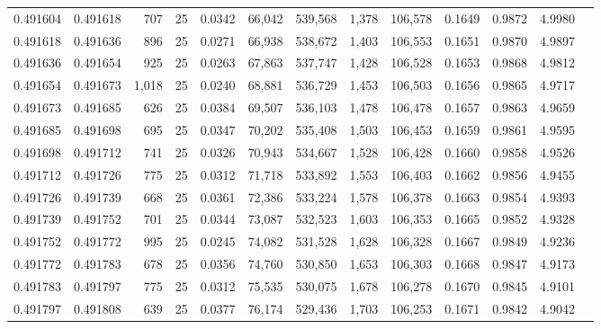 \begin{tabular}{rrrrrrrrrrrrr}
0.491604 & 0.491618 &   707 &  25 &                                     0.0342 &  66,042 & 539,568 &   1,378 & 106,578 & 0.1649 & 0.9872 & 4.9980 \\
0.491618 & 0.491636 &   896 &  25 &                                     0.0271 &  66,938 & 538,672 &   1,403 & 106,553 & 0.1651 & 0.9870 & 4.9897 \\
0.491636 & 0.491654 &   925 &  25 &                                     0.0263 &  67,863 & 537,747 &   1,428 & 106,528 & 0.1653 & 0.9868 & 4.9812 \\
0.491654 & 0.491673 & 1,018 &  25 &                                     0.0240 &  68,881 & 536,729 &   1,453 & 106,503 & 0.1656 & 0.9865 & 4.9717 \\
0.491673 & 0.491685 &   626 &  25 &                                     0.0384 &  69,507 & 536,103 &   1,478 & 106,478 & 0.1657 & 0.9863 & 4.9659 \\
0.491685 & 0.491698 &   695 &  25 &                                     0.0347 &  70,202 & 535,408 &   1,503 & 106,453 & 0.1659 & 0.9861 & 4.9595 \\
0.491698 & 0.491712 &   741 &  25 &                                     0.0326 &  70,943 & 534,667 &   1,528 & 106,428 & 0.1660 & 0.9858 & 4.9526 \\
0.491712 & 0.491726 &   775 &  25 &                                     0.0312 &  71,718 & 533,892 &   1,553 & 106,403 & 0.1662 & 0.9856 & 4.9455 \\
0.491726 & 0.491739 &   668 &  25 &                                     0.0361 &  72,386 & 533,224 &   1,578 & 106,378 & 0.1663 & 0.9854 & 4.9393 \\
0.491739 & 0.491752 &   701 &  25 &                                     0.0344 &  73,087 & 532,523 &   1,603 & 106,353 & 0.1665 & 0.9852 & 4.9328 \\
0.491752 & 0.491772 &   995 &  25 &                                     0.0245 &  74,082 & 531,528 &   1,628 & 106,328 & 0.1667 & 0.9849 & 4.9236 \\
0.491772 & 0.491783 &   678 &  25 &                                     0.0356 &  74,760 & 530,850 &   1,653 & 106,303 & 0.1668 & 0.9847 & 4.9173 \\
0.491783 & 0.491797 &   775 &  25 &                                     0.0312 &  75,535 & 530,075 &   1,678 & 106,278 & 0.1670 & 0.9845 & 4.9101 \\
0.491797 & 0.491808 &   639 &  25 &                                     0.0377 &  76,174 & 529,436 &   1,703 & 106,253 & 0.1671 & 0.9842 & 4.9042 \\

\end{tabular}
